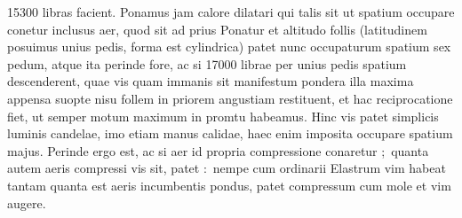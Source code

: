15300 libras facient.%
Ponamus jam calore dilatari%
%
qui talis sit
ut spatium occupare conetur inclusus aer,%
%
quod sit ad prius
Ponatur et altitudo follis%
(latitudinem posuimus unius pedis,%
forma est cylindrica)%
patet %
nunc occupaturum spatium sex pedum,%
atque ita perinde fore,
ac si 17000 librae%
per unius pedis%
spatium descenderent,
quae vis%
quam immanis sit%
manifestum
pondera illa maxima appensa%
suopte nisu%
follem in priorem angustiam restituent,%
et hac reciprocatione fiet,%
ut semper motum maximum in promtu habeamus.%
\pend%
\pstart%
Hinc
vis patet%
simplicis luminis candelae,%
%
%
imo etiam manus calidae,%
%
haec enim imposita
occupare spatium majus.%
Perinde ergo est,
ac si aer id propria compressione%
conaretur%
\lbrack;\rbrack\
quanta autem aeris compressi%
vis sit,%
patet%
\lbrack:\rbrack\
nempe cum ordinarii%
Elastrum%
vim habeat tantam%
quanta est aeris incumbentis pondus,%
%
\indexS{aer incumbens}
patet compressum%
cum mole%
et vim augere.%

